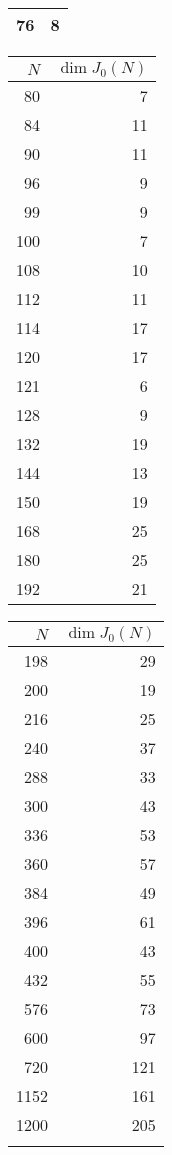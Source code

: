 \documentclass{article}
\begin{document}
\begin{table}
\begin{tabular}{rr}
        76 & 8 \\
        \bottomrule
    \end{tabular}
    \begin{tabular}{rr}
        \toprule
        $N$ & $\dim J_0(N)$ \\
        \midrule
        80 & 7 \\
        84 & 11 \\
        90 & 11 \\
        96 & 9 \\
        99 & 9 \\
        100 & 7 \\
        108 & 10 \\
        112 & 11 \\
        114 & 17 \\
        120 & 17 \\
        121 & 6 \\
        128 & 9 \\
        132 & 19 \\
        144 & 13 \\
        150 & 19 \\
        168 & 25 \\
        180 & 25 \\
        192 & 21 \\
        \bottomrule
    \end{tabular}
    \begin{tabular}{rr}
        \toprule
        $N$ & $\dim J_0(N)$ \\
        \midrule
        198 & 29 \\
        200 & 19 \\
        216 & 25 \\
        240 & 37 \\
        288 & 33 \\
        300 & 43 \\
        336 & 53 \\
        360 & 57 \\
        384 & 49 \\
        396 & 61 \\
        400 & 43 \\
        432 & 55 \\
        576 & 73 \\
        600 & 97 \\
        720 & 121 \\
        1152 & 161 \\
        1200 & 205 \\
            & \\
        \bottomrule
    \end{tabular}
\end{table}
\end{document}
